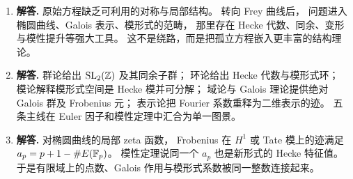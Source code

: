 \begin{enumerate}[label=\textbf{\arabic*.}, leftmargin=*, itemsep=1em]
\item \textbf{解答.} 原始方程缺乏可利用的对称与局部结构。 转向 Frey 曲线后， 问题进入椭圆曲线、Galois 表示、模形式的范畴， 那里存在 Hecke 代数、同余、变形与模性提升等强大工具。 这不是绕路，而是把孤立方程嵌入更丰富的结构理论。
\item \textbf{解答.} 群论给出 $\mathrm{SL}_2(\mathbb{Z})$ 及其同余子群； 环论给出 Hecke 代数与模形式环； 模论解释模形式空间是 Hecke 模并可分解； 域论与 Galois 理论提供绝对 Galois 群及 Frobenius 元； 表示论把 Fourier 系数重释为二维表示的迹。 五条主线在 Euler 因子和模性定理中汇合为单一图景。
\item \textbf{解答.} 对椭圆曲线的局部 zeta 函数，
Frobenius 在 $H^1$ 或 Tate 模上的迹满足
$a_p=p+1-\#E(\mathbb{F}_p)$。
模性定理说同一个 $a_p$ 也是新形式的 Hecke 特征值。
于是有限域上的点数、Galois 作用与模形式系数被同一整数连接起来。
\end{enumerate}
